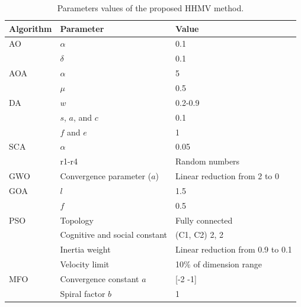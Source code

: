 \documentclass[12pt]{Definitions/academia}
\begin{document}
\begin{table}[!t]
  \caption{Parameters values of the proposed HHMV method.}
  \label{Parameter10}
\centering
\begin{tabular}{lll}
\toprule
Algorithm& Parameter &Value\\
\midrule
AO & $\alpha$&0.1\\
   &$\delta$ &0.1\\
AOA & $\alpha$&5\\
   &$\mu$ &0.5\\
DA&$w$& 0.2-0.9\\
&$s$, $a$, and $c$ &0.1\\
&$f$ and $e$&1\\
SCA&$\alpha$&0.05\\
 &r1-r4&Random numbers\\
GWO& Convergence parameter ($a$) &Linear reduction from 2 to 0 \\
GOA&$l$&1.5\\
&$f$&0.5\\
PSO&Topology &Fully connected\\
&Cognitive and social constant& (C1, C2) 2, 2\\
&Inertia weight &Linear reduction from 0.9 to 0.1\\
&Velocity limit& 10\% of dimension range\\
MFO&	Convergence constant $a$&  [-2 -1] \\
&Spiral factor $b$ &1\\

\bottomrule
\end{tabular}%
\end{table}
\end{document}
